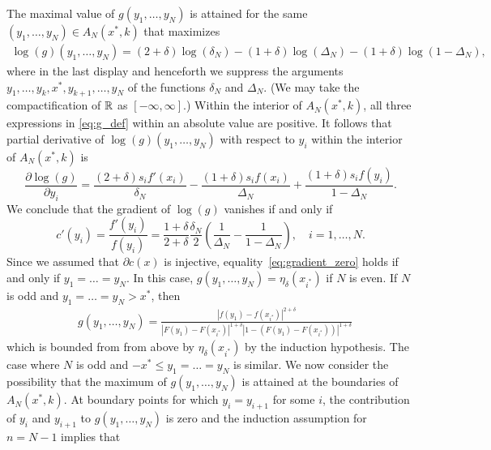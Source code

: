 \begin{proof-of-lemma}[\ref{lem:bound_intervals_delta}]
  The maximal value of $g(y_1,\ldots,y_N)$ is attained for the same
  $(y_1,\ldots,y_N) \in A_N(x^*,k)$ that maximizes
  \begin{align*}
    \log(g)(y_1,\ldots, y_N) =  (2+\delta) \log \left( \delta_N  \right)  - (1+\delta) \log \left( \Delta_N  \right) - (1+\delta) \log \left(1 - \Delta_N \right),
  \end{align*}
  where in the last display and henceforth we suppress the arguments
  $y_1,\ldots,y_k,x^*,y_{k+1},\ldots, y_N$ of the functions $\delta_N$ and
  $\Delta_N$. (We may take the compactification of $\mathbb{R}$ as $[-\infty, \infty]$.)
  Within the interior of $A_N(x^*,k)$, all three expressions in
  \eqref{eq:g_def} within an absolute value are positive. It follows that
  partial derivative of $\log(g)(y_1,\ldots,y_N)$ with respect to $y_i$ within
  the interior of $A_N(x^*,k)$ is
  \begin{equation*}
    \frac{\partial \log(g)}{\partial y_i} = \frac{(2+\delta) s_i
      f'(x_i)}{\delta_N } -\frac{(1+\delta) s_i f(x_i)}{\Delta_N } +
    \frac{(1+\delta)s_i f(y_i)}{1-\Delta_N }.
  \end{equation*}
  We conclude that the gradient of $\log(g)$ vanishes if and only if
  \begin{equation}
    \label{eq:gradient_zero}
    c'(y_i) = \frac{f'(y_i)}{f(y_i)} = \frac{1+\delta}{2+\delta} \frac{\delta_N}{2} \left( \frac{1}{\Delta_N} - \frac{1}{1-\Delta_N } \right),\quad i=1,\ldots,N.
  \end{equation}
  Since we assumed that $\partial c(x)$ is injective,
  equality~\eqref{eq:gradient_zero} holds if and only if $y_1 = \ldots
  = y_N$. In this case, $g(y_1,\ldots,y_N) = \eta_\delta(x_{i^*})$ if $N$ is
  even. If $N$ is odd and $y_1 = \ldots = y_N > x^*$, then
  \begin{align*}
    & g(y_1,\ldots,y_N) = \frac{\left| f(y_1)-f(x_{i^*})  \right|^{2+\delta}} { 
      \left|  F(y_1) - F(x_{i^*}) \right|^{1+ \delta} 
      \left| 1 - (F(y_1) -F(x_{i^*})) \right|^{1+ \delta} } 
  \end{align*} 
  which is bounded from from above by $\eta_\delta(x_{i^*})$ by the induction hypothesis. The case where $N$ is odd and $-x^* \leq y_1 = \ldots = y_N$ is similar. 
  We now consider the possibility that the maximum of $g(y_1,\ldots,y_N)$ is attained at the boundaries of $A_N(x^*,k)$. At boundary points for which $y_i = y_{i+1}$ for some $i$, the contribution of $y_i$ and $y_{i+1}$ to $g(y_1,\ldots,y_N)$ is zero and the induction assumption for $n=N-1$ implies that 
  \begin{equation*}

\end{equation*}
\end{proof-of-lemma}
